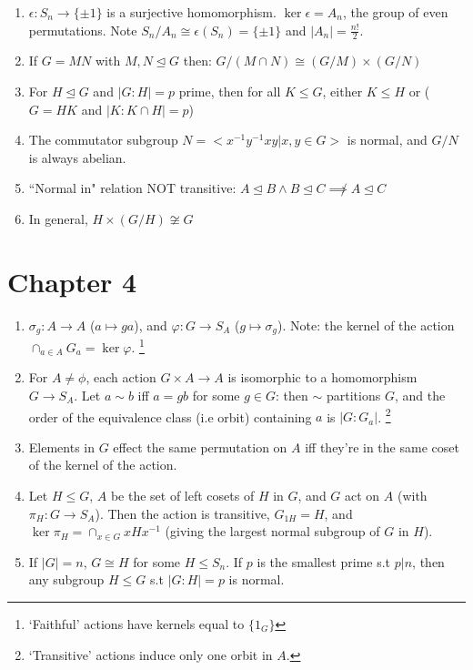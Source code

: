 \documentclass{article}
\newcommand{\normin}{\trianglelefteq}
\begin{document}
\begin{enumerate}[1.]
        The sign of a permutation (i.e the parity of the number of
        2-cycles $\epsilon(\sigma) \in \{\pm 1\}$
        \footnote{An $m$-cycle is composed of $m-1$ transpositions,
            immediately giving $\epsilon(\sigma) = Parity(m-1)$.}
        ) is representation-independent.
    \item $\epsilon : S_n \rightarrow \{\pm 1\}$ is a surjective
        homomorphism. $\ker \epsilon = A_n$, the group of even permutations.
        Note $S_n/A_n \cong \epsilon(S_n) = \{\pm 1\}$ and $|A_n| =
        \frac{n!}{2}$.
    \item If $G = MN$ with $M, N \normin G$ then: $G/(M \cap N) \cong (G/M) \times
    (G/N)$
    \item For $H \trianglelefteq G$ and $|G : H| = p$ prime, then for all $K
    \leq G$, either $K \leq H$ or ($G = HK$ and $|K:K \cap H| = p$)
    \item The commutator subgroup $N = <x^{-1}y^{-1}xy | x, y \in G>$ is normal,
    and $G/N$ is always abelian.
    \item ``Normal in" relation NOT transitive: $A \normin B \wedge B \normin C
    \not\implies A \normin C$
    \item In general, $H \times (G / H) \not\cong G$
\end{enumerate}

\section*{Chapter 4}

\begin{enumerate}[1.]
    \item $\sigma_g : A \rightarrow A$ ($a \mapsto ga$), and
        $\varphi : G \rightarrow S_A$ ($g \mapsto \sigma_g$).
        Note: the kernel of the action $\cap_{a \in A} G_a = \ker \varphi$.
        \footnote{`Faithful' actions have kernels equal to $\{1_G\}$}
    \item For $A \not= \phi$, each action $G \times A \rightarrow A$ is
        isomorphic to a homomorphism $G \rightarrow S_A$. Let $a \sim b$ iff $a
        = gb$ for some $g \in G$: then $\sim$ partitions $G$, and the order
        of the equivalence class (i.e orbit) containing $a$ is $|G : G_a|$.
        \footnote{`Transitive' actions induce only one orbit in $A$.}
    \item Elements in $G$ effect the same permutation on $A$ iff they're in
        the same coset of the kernel of the action.
    \item Let $H \leq G$, $A$ be the set of left cosets of $H$ in $G$, and
        $G$ act on $A$ (with $\pi_H : G \rightarrow S_A$). Then the action
        is transitive, $G_{1H} = H$, and $\ker \pi_H = \cap_{x \in G}
        xHx^{-1}$ (giving the largest normal subgroup of $G$ in $H$).
    \item If $|G| = n$, $G \cong H$ for some $H \leq S_n$. If $p$ is the
        smallest prime s.t $p | n$, then any subgroup $H \leq G$ s.t $|G :
        H| = p$ is normal.
\end{enumerate}
\end{document}
